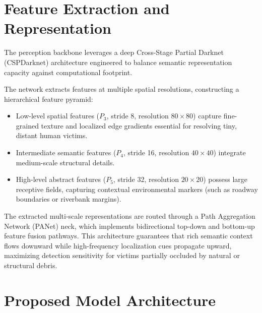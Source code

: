 \section{Feature Extraction and Representation}

The perception backbone leverages a deep Cross-Stage Partial Darknet (CSPDarknet) architecture engineered to balance semantic representation capacity against computational footprint. 

The network extracts features at multiple spatial resolutions, constructing a hierarchical feature pyramid:
\begin{itemize}
    \item Low-level spatial features ($P_3$, stride 8, resolution $80 \times 80$) capture fine-grained texture and localized edge gradients essential for resolving tiny, distant human victims.
    \item Intermediate semantic features ($P_4$, stride 16, resolution $40 \times 40$) integrate medium-scale structural details.
    \item High-level abstract features ($P_5$, stride 32, resolution $20 \times 20$) possess large receptive fields, capturing contextual environmental markers (such as roadway boundaries or riverbank margins).
\end{itemize}
The extracted multi-scale representations are routed through a Path Aggregation Network (PANet) neck, which implements bidirectional top-down and bottom-up feature fusion pathways. This architecture guarantees that rich semantic context flows downward while high-frequency localization cues propagate upward, maximizing detection sensitivity for victims partially occluded by natural or structural debris.

\section{Proposed Model Architecture}

